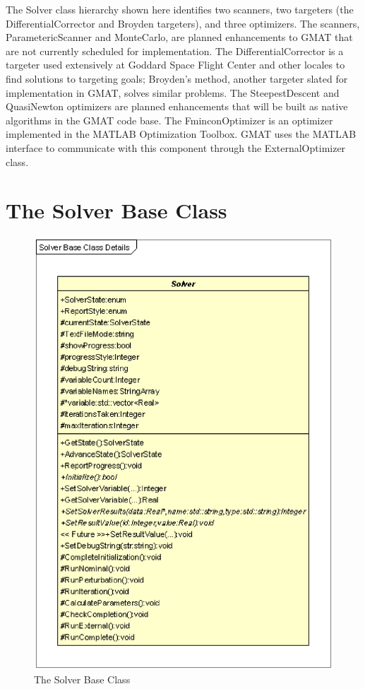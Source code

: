 The Solver class hierarchy shown here identifies two scanners, two targeters (the
DifferentialCorrector and Broyden targeters), and three optimizers.  The scanners,
ParametericScanner and MonteCarlo, are planned enhancements to GMAT that are not currently scheduled
for implementation.  The DifferentialCorrector is a targeter used extensively at Goddard Space
Flight Center and other locales to find solutions to targeting goals; Broyden's method, another
targeter slated for implementation in GMAT, solves similar problems.  The SteepestDescent and
QuasiNewton optimizers are planned enhancements that will be built as native algorithms in the
GMAT code base.  The FminconOptimizer is an optimizer implemented in the MATLAB Optimization
Toolbox.  GMAT uses the MATLAB interface to communicate with this component through the
ExternalOptimizer class.

\section{The Solver Base Class}

\begin{figure}[ht]
\begin{center}
\includegraphics[scale=0.5]{Images/SolverBaseClassDetails.eps}
\caption{\label{figure:SolverBaseClass}The Solver Base Class}
\end{center}
\end{figure}

